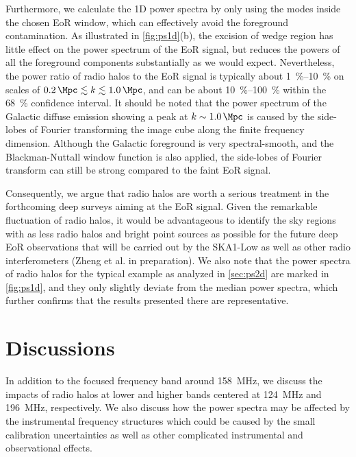 \documentclass[modern]{aastex62}
\begin{document}
Furthermore, we calculate the 1D power spectra by only using the modes
inside the chosen EoR window, which can effectively avoid the foreground
contamination.
As illustrated in \autoref{fig:ps1d}(b), the excision of wedge region
has little effect on the power spectrum of the EoR signal, but reduces
the powers of all the foreground components substantially as we would
expect.
Nevertheless, the power ratio of radio halos to the EoR signal is
typically about \SIrange[range-units=repeat]{1}{10}{\percent} on scales
of $\SI{0.2}{\per\Mpc} \lesssim k \lesssim \SI{1.0}{\per\Mpc}$,
and can be about \SIrange[range-units=repeat]{10}{100}{\percent} within
the \SI{68}{\percent} confidence interval.
It should be noted that the power spectrum of the Galactic diffuse
emission showing a peak at $k \sim \SI{1.0}{\per\Mpc}$ is caused by the
side-lobes of Fourier transforming the image cube along the finite
frequency dimension.
Although the Galactic foreground is very spectral-smooth, and the
Blackman-Nuttall window function is also applied, the side-lobes of Fourier
transform can still be strong compared to the faint EoR signal.

Consequently, we argue that radio halos are worth a serious treatment
in the forthcoming deep surveys aiming at the EoR signal.
Given the remarkable fluctuation of radio halos, it would be advantageous
to identify the sky regions with as less radio halos and bright point
sources as possible for the future deep EoR observations that will be
carried out by the SKA1-Low as well as other radio interferometers
(Zheng et al. in preparation).
We also note that the power spectra of radio halos for the typical
example as analyzed in \autoref{sec:ps2d} are marked in \autoref{fig:ps1d},
and they only slightly deviate from the median power spectra, which
further confirms that the results presented there are representative.


\section{Discussions}
\label{sec:discussions}

In addition to the focused frequency band around \SI{158}{\MHz}, we
discuss the impacts of radio halos at lower and higher bands centered
at \SI{124}{\MHz} and \SI{196}{\MHz}, respectively.
We also discuss how the power spectra may be affected by the instrumental
frequency structures which could be caused by the small calibration
uncertainties as well as other complicated instrumental and observational
effects.
\end{document}

